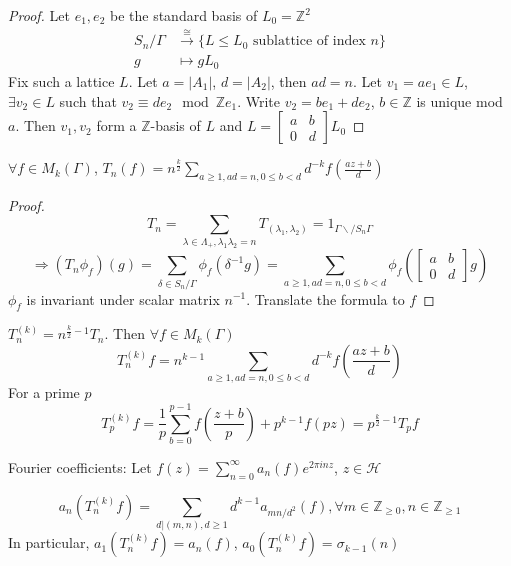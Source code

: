 \documentclass[main]{subfiles}
\begin{document}
\begin{proof}
Let $e_1,e_2$ be the standard basis of $L_0=\mathbb Z^2$
\begin{align*}
S_n/\Gamma&\xrightarrow{\cong}\{L\leq L_0\text{ sublattice of index }n\} \\
g&\mapsto gL_0
\end{align*}
Fix such a lattice $L$. Let $a=|A_1|$, $d=|A_2|$, then $ad=n$. Let $v_1=ae_1\in L$, $\exists v_2\in L$ such that $v_2\equiv de_2\mod \mathbb Z e_1$. Write $v_2=be_1+de_2$, $b\in\mathbb Z$ is unique mod $a$. Then $v_1,v_2$ form a $\mathbb Z$-basis of $L$ and $L=\begin{bmatrix}
a&b\\
0&d
\end{bmatrix}L_0$
\end{proof}

\begin{corollary}
$\forall f\in M_k(\Gamma)$, $T_n(f)=n^{\frac{k}{2}}\sum_{a\geq1,ad=n,0\leq b<d}d^{-k}f(\frac{az+b}{d})$
\end{corollary}

\begin{proof}
\[T_n=\sum_{\lambda\in\Lambda_+,\lambda_1\lambda_2=n}T_{(\lambda_1,\lambda_2)}=1_{\Gamma\backslash/S_n\Gamma}\]
\[\Rightarrow(T_n\phi_f)(g)=\sum_{\delta\in S_n/\Gamma}\phi_f(\delta^{-1}g)=\sum_{a\geq1,ad=n,0\leq b<d}\phi_f\left(\begin{bmatrix}
a&b\\
0&d
\end{bmatrix}g\right)\]
$\phi_f$ is invariant under scalar matrix $n^{-1}$. Translate the formula to $f$
\end{proof}

\begin{definition}
$T_n^{(k)}=n^{\frac{k}{2}-1}T_n$. Then $\forall f\in M_k(\Gamma)$
\[T^{(k)}_nf=n^{k-1}\sum_{a\geq1,ad=n,0\leq b<d}d^{-k}f(\frac{az+b}{d})\]
For a prime $p$
\[T^{(k)}_pf=\frac{1}{p}\sum_{b=0}^{p-1}f(\frac{z+b}{p})+p^{k-1}f(pz)=p^{\frac{k}{2}-1}T_pf\]
\end{definition}

Fourier coefficients: Let $f(z)=\sum_{n=0}^\infty a_n(f)e^{2\pi inz}$, $z\in\mathcal H$

\begin{corollary}
\[a_n(T^{(k)}_nf)=\sum_{d|(m,n),d\geq1}d^{k-1}a_{mn/d^2}(f),\forall m\in\mathbb Z_{\geq0}, n\in\mathbb Z_{\geq1}\]
In particular, $a_1(T^{(k)}_nf)=a_n(f)$, $a_0(T^{(k)}_nf)=\sigma_{k-1}(n)$
\end{corollary}
\end{document}
